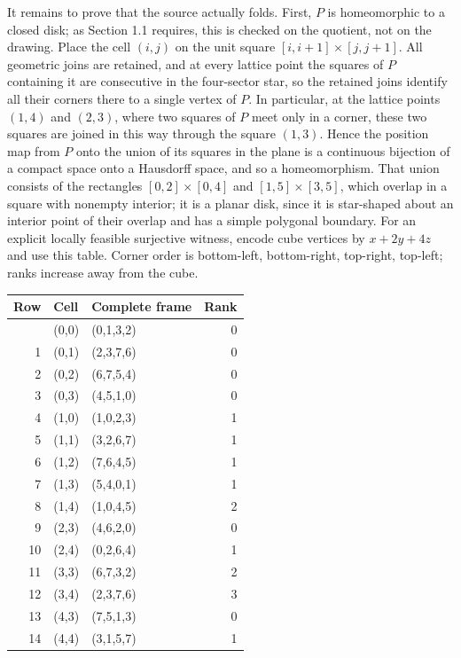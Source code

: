 \documentclass[
  11pt,
]{article}
\newcounter{none} %
\begin{document}
It remains to prove that the source actually folds. First, \(P\) is
homeomorphic to a closed disk; as Section 1.1 requires, this is checked
on the quotient, not on the drawing. Place the cell \((i,j)\) on the
unit square \([i,i+1]\times[j,j+1]\). All geometric joins are retained,
and at every lattice point the squares of \(P\) containing it are
consecutive in the four-sector star, so the retained joins identify all
their corners there to a single vertex of \(P\). In particular, at the
lattice points \((1,4)\) and \((2,3)\), where two squares of \(P\) meet
only in a corner, these two squares are joined in this way through the
square \((1,3)\). Hence the position map from \(P\) onto the union of
its squares in the plane is a continuous bijection of a compact space
onto a Hausdorff space, and so a homeomorphism. That union consists of
the rectangles \([0,2]\times[0,4]\) and \([1,5]\times[3,5]\), which
overlap in a square with nonempty interior; it is a planar disk, since
it is star-shaped about an interior point of their overlap and has a
simple polygonal boundary. For an explicit locally feasible surjective
witness, encode cube vertices by \(x+2y+4z\) and use this table. Corner
order is bottom-left, bottom-right, top-right, top-left; ranks increase
away from the cube.

{\def\LTcaptype{none} %
\begin{longtable}[]{@{}rllr@{}}
\toprule\noalign{}
Row & Cell & Complete frame & Rank \\
\midrule\noalign{}
\endhead
\bottomrule\noalign{}
\endlastfoot
0 & (0,0) & (0,1,3,2) & 0 \\
1 & (0,1) & (2,3,7,6) & 0 \\
2 & (0,2) & (6,7,5,4) & 0 \\
3 & (0,3) & (4,5,1,0) & 0 \\
4 & (1,0) & (1,0,2,3) & 1 \\
5 & (1,1) & (3,2,6,7) & 1 \\
6 & (1,2) & (7,6,4,5) & 1 \\
7 & (1,3) & (5,4,0,1) & 1 \\
8 & (1,4) & (1,0,4,5) & 2 \\
9 & (2,3) & (4,6,2,0) & 0 \\
10 & (2,4) & (0,2,6,4) & 1 \\
11 & (3,3) & (6,7,3,2) & 2 \\
12 & (3,4) & (2,3,7,6) & 3 \\
13 & (4,3) & (7,5,1,3) & 0 \\
14 & (4,4) & (3,1,5,7) & 1 \\
\end{longtable}
}
\end{document}
